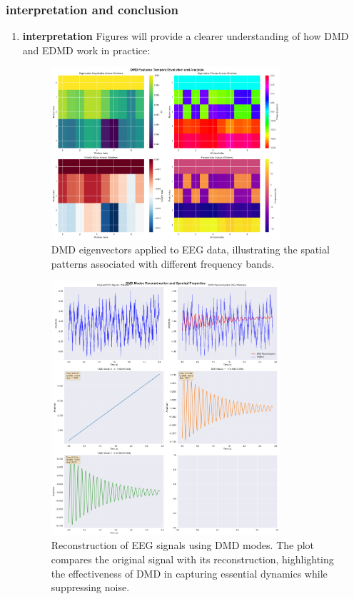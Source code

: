 \documentclass[a4paper,12pt,twoside]{article}
\begin{document}
\subsubsection{interpretation and conclusion}
\begin{enumerate}
    
\item  \textbf{interpretation}
Figures will provide a clearer understanding of how DMD and EDMD work in practice:


\begin{figure}[H]
    \centering
    \includegraphics[width=0.8\textwidth]{img/dmd features temporal evolution and analysis.png}
    \caption{DMD eigenvectors applied to EEG data, illustrating the spatial patterns associated with different frequency bands.}
    \label{fig:dmd_eigenvectors}
\end{figure}


\begin{figure}[H]
    \centering
    \includegraphics[width=0.8\textwidth]{img/dmd reconstructing eeg.png}
    \caption{Reconstruction of EEG signals using DMD modes. The plot compares the original signal with its reconstruction, highlighting the effectiveness of DMD in capturing essential dynamics while suppressing noise.}
    \label{fig:dmd_reconstruction}
\end{figure}



\end{enumerate}
\end{document}
